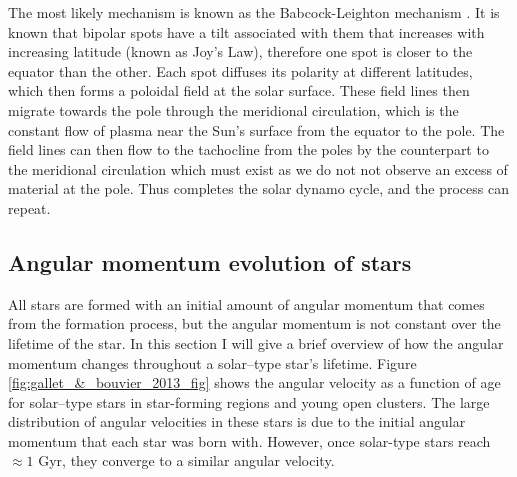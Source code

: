 The most likely mechanism is known as the Babcock-Leighton mechanism \citep{Babcock_1961,Leighton_1969}. It is known that bipolar spots have a tilt associated with them that increases with increasing latitude (known as Joy's Law), therefore one spot is closer to the equator than the other. Each spot diffuses its polarity at different latitudes, which then forms a poloidal field at the solar surface. These field lines then migrate towards the pole through the meridional circulation, which is the constant flow of plasma near the Sun's surface from the equator to the pole. The field lines can then flow to the tachocline from the poles by the counterpart to the meridional circulation which must exist as we do not not observe an excess of material at the pole. Thus completes the solar dynamo cycle, and the process can repeat.

\subsection{Angular momentum evolution of stars}

All stars are formed with an initial amount of angular momentum that comes from the formation process, but the angular momentum is not constant over the lifetime of the star. In this section I will give a brief overview of how the angular momentum changes throughout a solar--type star's lifetime. Figure \ref{fig:gallet_&_bouvier_2013_fig} shows the angular velocity as a function of age for solar--type stars in star-forming regions and young open clusters. The large distribution of angular velocities in these stars is due to the initial angular momentum that each star was born with. However, once solar-type stars reach $\approx 1$ Gyr, they converge to a similar angular velocity.


